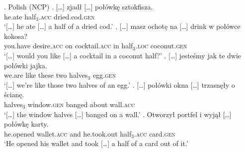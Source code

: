 \ex.\label{ex:nkjp-polowka} Polish (NCP)
\ag. [\dots] {zjadł [\dots]} połówkę sztokfisza.\label{ex:nkjp-polowka-cod}\\
{} he.ate half$_{3}$\textsc{.acc} dried.cod\textsc{.gen}\\
`[\dots] he ate [\dots] a half of a dried cod.'
\bg. [\dots] masz ochotę {na [\dots]} drink w połówce kokosa?\label{ex:nkjp-polowka-coconut}\\
{} you.have desire\textsc{.acc} on cocktail\textsc{.acc} in half$_{3}$\textsc{.loc} coconut\textsc{.gen}\\
`[\dots] would you like [\dots] a cocktail in a coconut half?'
\bg. [\dots] jesteśmy jak te dwie połówki jajka.\label{ex:nkjp-polowka-egg}\\
{} we.are like these two halves$_3$ egg\textsc{.gen}\\
`[\dots] we're like those two halves of an egg.'
\bg. [\dots] połówki {okna [\dots]} trzasnęły o ścianę.\label{ex:nkjp-polowka-window}\\
{} halves$_{3}$ window\textsc{.gen} banged about wall\textsc{.acc}\\
`[\dots] the window halves [\dots] banged on a wall.'
\bg. Otworzył portfel i {wyjął [\dots]} połówkę karty.\label{ex:nkjp-polowka-card}\\
he.opened wallet\textsc{.acc} and he.took.out half$_{3}$\textsc{.acc} card\textsc{.gen}\\
`He opened his wallet and took [\dots] a half of a card out of it.'

